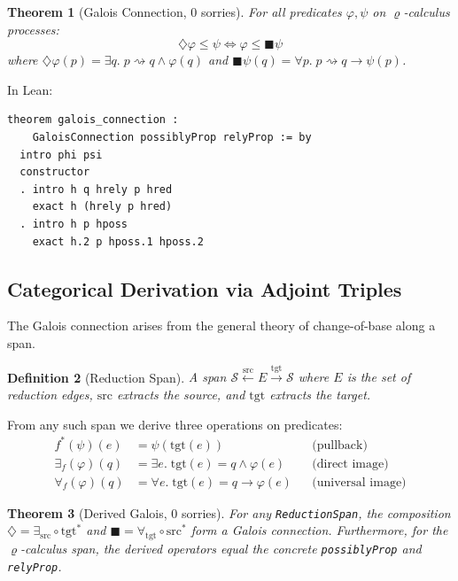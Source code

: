 \documentclass[]{article}
\newtheorem{theorem}{Theorem}
\newtheorem{definition}[theorem]{Definition}
\newcommand{\code}[1]{\texttt{#1}}
\newcommand{\rhocalc}{\ensuremath{\varrho}}
\newcommand{\Dia}{\ensuremath{\diamondsuit}}
\newcommand{\Bx}{\ensuremath{\blacksquare}}
\begin{document}
\begin{theorem}[Galois Connection, 0 sorries]
\label{thm:galois}
For all predicates $\varphi, \psi$ on \rhocalc{}-calculus processes:
$$\Dia\varphi \le \psi \iff \varphi \le \Bx\psi$$
where $\Dia\varphi(p) = \exists q.\; p \rightsquigarrow q \wedge \varphi(q)$
and $\Bx\psi(q) = \forall p.\; p \rightsquigarrow q \to \psi(p)$.
\end{theorem}

In Lean:
\begin{lstlisting}[caption={The Galois connection (Reduction.lean)}]
theorem galois_connection :
    GaloisConnection possiblyProp relyProp := by
  intro phi psi
  constructor
  . intro h q hrely p hred
    exact h (hrely p hred)
  . intro h p hposs
    exact h.2 p hposs.1 hposs.2
\end{lstlisting}

\subsection{Categorical Derivation via Adjoint Triples}

The Galois connection arises from the general theory of change-of-base along
a span.

\begin{definition}[Reduction Span]
A span $\mathcal{S} \xleftarrow{\mathrm{src}} E \xrightarrow{\mathrm{tgt}} \mathcal{S}$
where $E$ is the set of reduction edges, $\mathrm{src}$ extracts the source, and
$\mathrm{tgt}$ extracts the target.
\end{definition}

From any such span we derive three operations on predicates:
\begin{align}
  f^*(\psi)(e) &= \psi(\mathrm{tgt}(e))
    && \text{(pullback)} \\
  \exists_f(\varphi)(q) &= \exists e.\; \mathrm{tgt}(e) = q \wedge \varphi(e)
    && \text{(direct image)} \\
  \forall_f(\varphi)(q) &= \forall e.\; \mathrm{tgt}(e) = q \to \varphi(e)
    && \text{(universal image)}
\end{align}

\begin{theorem}[Derived Galois, 0 sorries]
\label{sec:derived}
For any \code{ReductionSpan}, the composition $\Dia = \exists_{\mathrm{src}} \circ
\mathrm{tgt}^*$ and $\Bx = \forall_{\mathrm{tgt}} \circ \mathrm{src}^*$ form a
Galois connection.  Furthermore, for the \rhocalc{}-calculus span, the derived operators
equal the concrete \code{possiblyProp} and \code{relyProp}.
\end{theorem}
\end{document}
